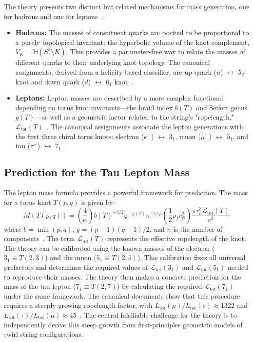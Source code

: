 \documentclass[11pt, a4paper]{article}
\begin{document}
        The theory presents two distinct but related mechanisms for mass generation, one for hadrons and one for leptons~\cite{sst_canon}.
        \begin{itemize}
        \item \textbf{Hadrons:} The masses of constituent quarks are posited to be proportional to a purely topological invariant: the hyperbolic volume of the knot complement, $V_K = \mathbb{H}(S^3 \setminus K)$. This provides a parameter-free way to relate the masses of different quarks to their underlying knot topology. The canonical assignments, derived from a helicity-based classifier, are up quark ($u$) $\leftrightarrow$ $5_2$ knot and down quark ($d$) $\leftrightarrow$ $6_1$ knot~\cite{sst_canon}.
        \item \textbf{Leptons:} Lepton masses are described by a more complex functional depending on torus knot invariants—the braid index $b(T)$ and Seifert genus $g(T)$—as well as a geometric factor related to the string's "ropelength," $\mathcal{L}_{\text{tot}}(T)$~\cite{sst_canon}. The canonical assignments associate the lepton generations with the first three chiral torus knots: electron ($e^-$) $\leftrightarrow$ $3_1$, muon ($\mu^-$) $\leftrightarrow$ $5_1$, and tau ($\tau^-$) $\leftrightarrow$ $7_1$~\cite{sst_canon}.
        \end{itemize}

    \subsection{Prediction for the Tau Lepton Mass}

        The lepton mass formula provides a powerful framework for prediction. The mass for a torus knot $T(p,q)$ is given by:
        \begin{equation}
        M(T(p,q)) = \left(\frac{4}{\alpha}\right)b(T)^{-3/2}\varphi^{-g(T)}n^{-1/\varphi}\left(\frac{1}{2}\rho_{f}v_{\mathcal{O}}^{2}\right)\frac{\pi r_{c}^{3}\mathcal{L}_{\text{tot}}(T)}{c^{2}}
        \end{equation}
        where $b=\min(p,q)$, $g=(p-1)(q-1)/2$, and $n$ is the number of components~\cite{sst_canon}. The term $\mathcal{L}_{\text{tot}}(T)$ represents the effective ropelength of the knot. The theory can be calibrated using the known masses of the electron ($3_1 \equiv T(2,3)$) and the muon ($5_1 \equiv T(2,5)$). This calibration fixes all universal prefactors and determines the required values of $\mathcal{L}_{\text{tot}}(3_1)$ and $\mathcal{L}_{\text{tot}}(5_1)$ needed to reproduce their masses. The theory then makes a concrete prediction for the mass of the tau lepton ($7_1 \equiv T(2,7)$) by calculating the required $\mathcal{L}_{\text{tot}}(7_1)$ under the same framework. The canonical documents show that this procedure requires a steeply growing ropelength factor, with $L_{\text{tot}}(\mu)/L_{\text{tot}}(e) \approx 1322$ and $L_{\text{tot}}(\tau)/L_{\text{tot}}(\mu) \approx 45$~\cite{sst_canon}. The central falsifiable challenge for the theory is to independently derive this steep growth from first-principles geometric models of swirl string configurations.
\end{document}
